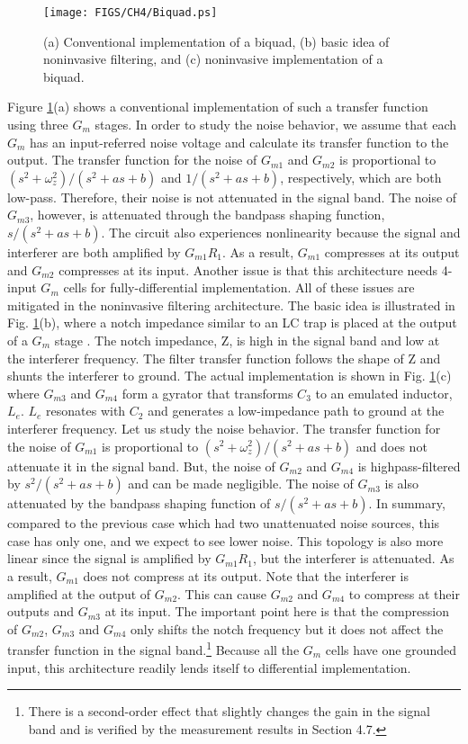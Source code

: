 \begin{figure}[htb!]
\centering
\texttt{[image: FIGS/CH4/Biquad.ps]}
\caption{(a) Conventional implementation of a biquad, (b) basic idea of noninvasive filtering, and (c) noninvasive implementation of a biquad.}
\label{fig:biquad}
\end{figure}
Figure \ref{fig:biquad}(a) shows a conventional implementation of such a transfer function using three $G_m$ stages.  
In order to study the noise behavior, we assume that each $G_m$ has an input-referred noise voltage and calculate its transfer function to the output.
The transfer function for the noise of $G_{m1}$ and $G_{m2}$ is proportional to $(s^2+\omega_z^2)/(s^2+as+b)$ and $1/(s^2+as+b)$, respectively, which
are both low-pass. Therefore, their noise is not attenuated in the signal band.
The noise of $G_{m3}$, however, is attenuated through the bandpass shaping function, $s/(s^2+as+b)$. 
The circuit also experiences nonlinearity because the signal and interferer are both amplified by $G_{m1}R_1$. As a result, $G_{m1}$ compresses at its
output and $G_{m2}$ compresses at its input. Another issue is that this architecture needs 4-input $G_m$ cells for fully-differential implementation.
All of these issues are mitigated in the noninvasive filtering architecture. 
The basic idea is illustrated in Fig. \ref{fig:biquad}(b), where a notch impedance similar to an LC trap is placed at the output of a $G_m$ stage
\cite{Zolfaghari}. The notch impedance, Z, is high in the signal band and low at the interferer frequency. The filter transfer function follows the
shape of Z and shunts the interferer to ground. 
The actual implementation is shown in Fig. \ref{fig:biquad}(c) where $G_{m3}$ and $G_{m4}$ form a gyrator that transforms $C_3$ to an emulated inductor,
$L_e$. $L_e$ resonates with $C_2$ and generates a low-impedance path to ground at the interferer frequency. 
Let us study the noise behavior. The transfer function for the noise of $G_{m1}$ is proportional to $(s^2+\omega_z^2)/(s^2+as+b)$ and does not
attenuate it in the signal band. But, the noise of $G_{m2}$ and $G_{m4}$ is highpass-filtered by $s^2/(s^2+as+b)$ and can be made negligible. The
noise of $G_{m3}$ is also attenuated by the bandpass shaping function of $s/(s^2+as+b)$. 
In summary, compared to the previous case which had two unattenuated noise sources, this case has only one, and we expect to see lower noise.  
This topology is also more linear since the signal is amplified by $G_{m1}R_1$, but the interferer is attenuated. As a result, $G_{m1}$ does not
compress at its output. Note that the interferer is amplified at the output of $G_{m2}$. This can cause $G_{m2}$ and $G_{m4}$ to compress at their
outputs and $G_{m3}$ at its input. The important point here is that the compression of $G_{m2}$, $G_{m3}$ and $G_{m4}$ only shifts the notch frequency
but it does not affect the transfer function in the signal band.\footnote{There is a second-order effect that slightly changes the gain in the signal
band and is verified by the measurement results in Section 4.7.} Because all the $G_m$ cells have one grounded input, this architecture readily lends
itself to differential implementation.




